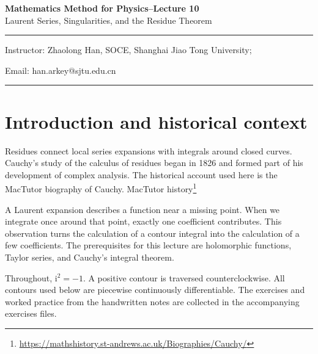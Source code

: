 \documentclass[11pt,a4paper]{article}
\theoremstyle{definition}
\theoremstyle{plain}
\begin{document}
\begin{center}
    {\LARGE \textbf{Mathematics Method for Physics--Lecture 10}} \\[0.6em]
    {\large Laurent Series, Singularities, and the Residue Theorem}
\end{center}

\vspace{-0.5em}
\noindent\rule{\textwidth}{0.5pt}
\vspace{0.3em}

\begin{center}
    Instructor: Zhaolong Han, SOCE, Shanghai Jiao Tong University;
\end{center}

\vspace{-0.6em}
\noindent Email: han.arkey@sjtu.edu.cn

\vspace{0.4em}
\noindent\rule{\textwidth}{0.5pt}

\vspace{0.8em}

\vspace{1.5em}

\section{Introduction and historical context}

Residues connect local series expansions with integrals around closed curves. Cauchy's study of the calculus of residues began in 1826 and formed part of his development of complex analysis. The historical account used here is the MacTutor biography of Cauchy. MacTutor history\footnote{\url{https://mathshistory.st-andrews.ac.uk/Biographies/Cauchy/}}

A Laurent expansion describes a function near a missing point. When we integrate once around that point, exactly one coefficient contributes. This observation turns the calculation of a contour integral into the calculation of a few coefficients. The prerequisites for this lecture are holomorphic functions, Taylor series, and Cauchy's integral theorem.

Throughout, $\mathrm{i}^2=-1$. A positive contour is traversed counterclockwise. All contours used below are piecewise continuously differentiable. The exercises and worked practice from the handwritten notes are collected in the accompanying exercises files.
\end{document}
